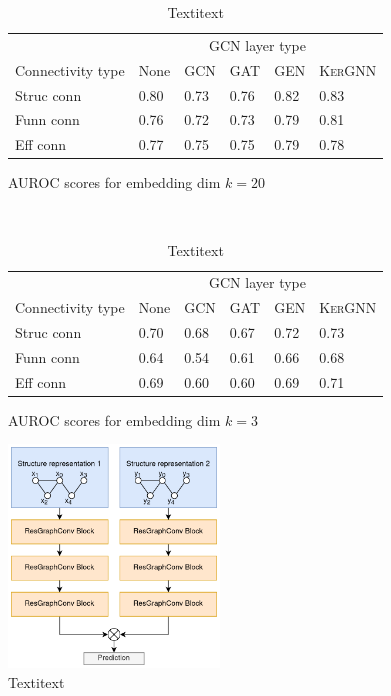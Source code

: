 \documentclass[]{article}
\begin{document}
\begin{table}
	\centering
	\renewcommand{\arraystretch}{1.2}
	\begin{subfigure}{1.\textwidth}
		\centering
		\begin{tabular}{|l|l|l|l|l|l|}
			\hline
			&\multicolumn{5}{c|}{GCN layer type}\\
			Connectivity type&None&\textsc{GCN}&\textsc{GAT}&\textsc{GEN}&\textsc{KerGNN}\\
			\hline
			Struc conn&0.80&0.73&0.76&0.82&0.83\\
			Funn conn&0.76&0.72&0.73&0.79&0.81\\
			Eff conn&0.77&0.75&0.75&0.79&0.78\\		
			\hline
		\end{tabular}
	
		\caption{AUROC scores for embedding dim $k=20$}
		\label{tab:results_connpred_20}
	\end{subfigure}\\

	\begin{subfigure}{1.0\textwidth}
		\vspace{0.5cm}
		\centering
		\begin{tabular}{|l|l|l|l|l|l|}
			\hline
			&\multicolumn{5}{c|}{GCN layer type}\\
			Connectivity type&None&\textsc{GCN}&\textsc{GAT}&\textsc{GEN}&\textsc{KerGNN}\\
			\hline
			Struc conn&0.70&0.68&0.67&0.72&0.73\\
			Funn conn&0.64&0.54&0.61&0.66&0.68\\
			Eff conn&0.69&0.60&0.60&0.69&0.71\\		
			\hline
		\end{tabular}
		
		\caption{AUROC scores for embedding dim $k=3$}
		\label{tab:results_connpred_3}
	\end{subfigure}	
	\caption{Textitext}
	\label{tab:conn_pred_GCN}
\end{table}

\begin{figure}
	\centering
	\includegraphics[width=0.5\textwidth]{figures/ConnPred_model.png}
	
	\caption{Textitext}
	\label{fig:conn_pred_model}
\end{figure}
\end{document}
